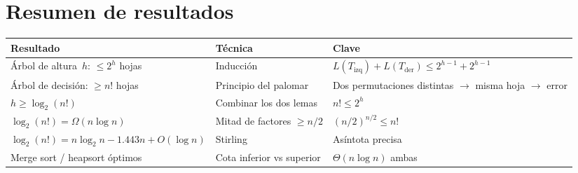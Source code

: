\documentclass[11pt, letterpaper]{article}
\theoremstyle{definition}
\theoremstyle{plain}
\theoremstyle{remark}
\begin{document}
\section{Resumen de resultados}

\begin{table}[h]
\centering
\begin{tabular}{llp{5.5cm}}
\toprule
\textbf{Resultado} & \textbf{Técnica} & \textbf{Clave} \\
\midrule
Árbol de altura~$h$: $\leq 2^h$ hojas
  & Inducción
  & $L(T_{\text{izq}}) + L(T_{\text{der}}) \leq 2^{h-1} + 2^{h-1}$ \\
Árbol de decisión: $\geq n!$ hojas
  & Principio del palomar
  & Dos permutaciones distintas $\to$ misma hoja $\to$ error \\
$h \geq \log_2(n!)$
  & Combinar los dos lemas
  & $n! \leq 2^h$ \\
$\log_2(n!) = \Omega(n \log n)$
  & Mitad de factores $\geq n/2$
  & $(n/2)^{n/2} \leq n!$ \\
$\log_2(n!) = n\log_2 n - 1.443n + O(\log n)$
  & Stirling
  & Asíntota precisa \\
Merge sort / heapsort óptimos
  & Cota inferior vs superior
  & $\Theta(n \log n)$ ambas \\
\bottomrule
\end{tabular}
\end{table}
\end{document}
